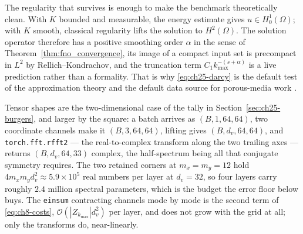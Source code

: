 The regularity that survives is enough to make the benchmark theoretically clean.
With $K$ bounded and measurable, the energy estimate gives $u \in
H^{1}_{0}(\Omega)$; with $K$ smooth, classical regularity lifts the solution to
$H^{2}(\Omega)$. The solution operator therefore has a positive smoothing order
$\alpha$ in the sense of Theorem~\ref{thm:fno_convergence}, its image of a compact
input set is precompact in $L^{2}$ by Rellich--Kondrachov, and the truncation term
$C_1 k_{\max}^{-(s+\alpha)}$ is a live prediction rather than a formality. That is why
\eqref{eq:ch25-darcy} is the default test of the approximation theory and the
default data source for porous-media work \cite{li2021fourier, wen2022ufno}.

Tensor shapes are the two-dimensional case of the tally in
Section~\ref{sec:ch25-burgers}, and larger by the square: a batch arrives as
$(B, 1, 64, 64)$, two coordinate channels make it $(B, 3, 64, 64)$, lifting gives
$(B, d_v, 64, 64)$, and \texttt{torch.fft.rfft2} --- the real-to-complex transform
along the two trailing axes --- returns $(B, d_v, 64, 33)$ complex, the half-spectrum
being all that conjugate symmetry requires. The two retained corners at
$m_x = m_y = 12$ hold $4 m_x m_y d_v^{2} \approx 5.9 \times 10^{5}$ real numbers
per layer at $d_v = 32$, so four layers carry roughly $2.4$ million spectral
parameters, which is the budget the error floor below buys. The \texttt{einsum}
contracting channels mode by mode is the second term of \eqref{eq:ch8-costs},
$\mathcal{O}(|Z_{k_{\max}}| d_v^{2})$ per
layer, and does not grow with the grid at all; only the transforms do, near-linearly.

